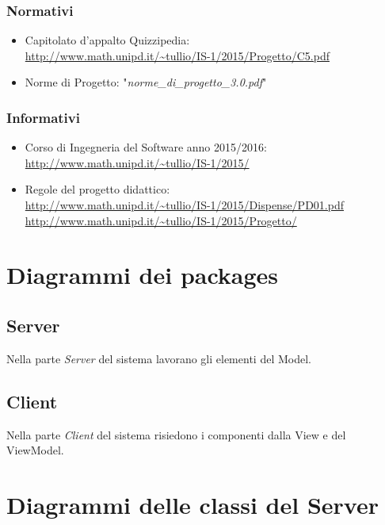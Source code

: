 \documentclass[a4paper,11pt]{article}
\begin{document}
		\subsubsection{Normativi}

		\begin{itemize}
			\item Capitolato d'appalto Quizzipedia:\\
			\url{http://www.math.unipd.it/~tullio/IS-1/2015/Progetto/C5.pdf}
			\item Norme di Progetto: "\textit{norme\_di\_progetto\_3.0.pdf}"
		\end{itemize}
		\subsubsection{Informativi}
		\begin{itemize}
			\item Corso di Ingegneria del Software anno 2015/2016:\\
			\url{http://www.math.unipd.it/~tullio/IS-1/2015/}
			\item Regole del progetto didattico:\\
			\url{http://www.math.unipd.it/~tullio/IS-1/2015/Dispense/PD01.pdf}
			\url{http://www.math.unipd.it/~tullio/IS-1/2015/Progetto/}\\
			\end{itemize}
	\pagebreak
	\newpage

		
	
	
	
	\section{Diagrammi dei packages}
		\subsection{Server}
		Nella parte \emph{Server} del sistema lavorano gli elementi del Model.
			
		\subsection{Client}
		Nella parte \emph{Client} del sistema risiedono i componenti dalla View e del ViewModel.
			
			
	
	\section{Diagrammi delle classi del Server}
		
\end{document}
